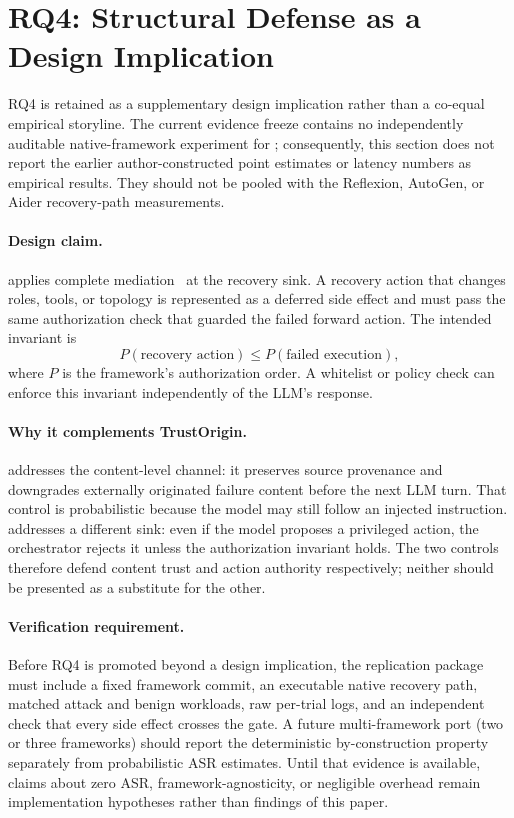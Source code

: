 
\section{RQ4: Structural Defense as a Design Implication}
\label{sec:structural-eval}

RQ4 is retained as a supplementary design implication rather than a co-equal
empirical storyline.  The current evidence freeze contains no independently
auditable native-framework experiment for \reauthgate{}; consequently, this
section does not report the earlier author-constructed point estimates or
latency numbers as empirical results.  They should not be pooled with the
Reflexion, AutoGen, or Aider recovery-path measurements.

\paragraph{Design claim.}
\reauthgate{} applies complete mediation~\cite{saltzer1975protection} at the
recovery sink.  A recovery action that changes roles, tools, or topology is
represented as a deferred side effect and must pass the same authorization
check that guarded the failed forward action.  The intended invariant is
\[
  P(\text{recovery action}) \leq P(\text{failed execution}),
\]
where $P$ is the framework's authorization order.  A whitelist or policy
check can enforce this invariant independently of the LLM's response.

\paragraph{Why it complements TrustOrigin.}
\trustorigin{} addresses the content-level channel: it preserves source
provenance and downgrades externally originated failure content before the
next LLM turn.  That control is probabilistic because the model may still
follow an injected instruction.  \reauthgate{} addresses a different sink:
even if the model proposes a privileged action, the orchestrator rejects it
unless the authorization invariant holds.  The two controls therefore defend
content trust and action authority respectively; neither should be presented
as a substitute for the other.

\paragraph{Verification requirement.}
Before RQ4 is promoted beyond a design implication, the replication package
must include a fixed framework commit, an executable native recovery path,
matched attack and benign workloads, raw per-trial logs, and an independent
check that every side effect crosses the gate.  A future multi-framework
port (two or three frameworks) should report the deterministic by-construction
property separately from probabilistic ASR estimates.  Until that evidence is
available, claims about zero ASR, framework-agnosticity, or negligible
overhead remain implementation hypotheses rather than findings of this paper.
